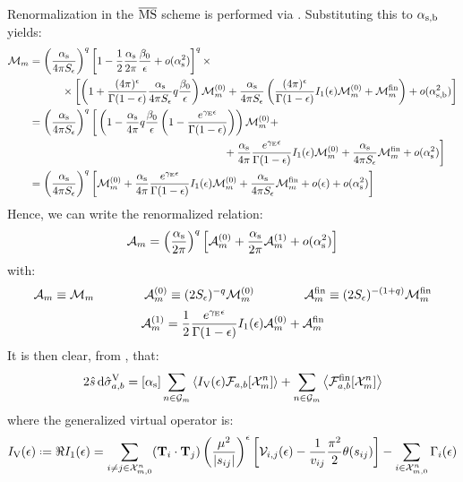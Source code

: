 Renormalization in the $ \overline{\text{MS}} $ scheme is performed via . Substituting this to $ \alpha_\text{s,b} $ yields:
\begin{equation*}
  \begin{split}
    \mathcal{M}_m
    & = \left( \frac{\alpha_\text{s}}{4\pi S_\epsilon} \right)^q \left[ 1 - \frac{1}{2} \frac{\alpha_\text{s}}{2\pi} \frac{\beta_0}{\epsilon} + o(\alpha_\text{s}^2) \right]^q \times \\
    & \qquad \quad \times \left[ \left( 1 + \frac{(4\pi)^\epsilon}{\Gamma(1-\epsilon)} \frac{\alpha_\text{s}}{4\pi S_\epsilon} q \frac{\beta_0}{\epsilon} \right) \mathcal{M}_m^{(0)} + \frac{\alpha_\text{s}}{4\pi S_\epsilon} \left( \frac{(4\pi)^\epsilon}{\Gamma(1-\epsilon)} I_1(\epsilon) \mathcal{M}_m^{(0)} + \mathcal{M}_m^\text{fin} \right) + o(\alpha_\text{s,b}^2) \right] \\
    & = \left( \frac{\alpha_\text{s}}{4\pi S_\epsilon} \right)^q \bigg[ \left( 1 - \frac{\alpha_\text{s}}{4\pi} q \frac{\beta_0}{\epsilon} \left( 1 - \frac{e^{\gamma_\text{E}\epsilon}}{\Gamma(1-\epsilon)} \right) \right) \mathcal{M}_m^{(0)} + \\
    & \qquad \qquad \qquad \qquad \qquad \qquad \qquad \qquad \qquad + \frac{\alpha_\text{s}}{4\pi} \frac{e^{\gamma_\text{E}\epsilon}}{\Gamma(1-\epsilon)} I_1(\epsilon) \mathcal{M}_m^{(0)} + \frac{\alpha_\text{s}}{4\pi S_\epsilon} \mathcal{M}_m^\text{fin} + o(\alpha_\text{s}^2) \bigg] \\
    & = \left( \frac{\alpha_\text{s}}{4\pi S_\epsilon} \right)^q \left[ \mathcal{M}_m^{(0)} + \frac{\alpha_\text{s}}{4\pi} \frac{e^{\gamma_\text{E}\epsilon}}{\Gamma(1-\epsilon)} I_1(\epsilon) \mathcal{M}_m^{(0)} + \frac{\alpha_\text{s}}{4\pi S_\epsilon} \mathcal{M}_m^\text{fin} + o(\epsilon) + o(\alpha_\text{s}^2) \right]
  \end{split}
\end{equation*}
Hence, we can write the renormalized relation:
\begin{equation}
  \mathcal{A}_m = \left( \frac{\alpha_\text{s}}{2\pi} \right)^q \left[ \mathcal{A}_m^{(0)} + \frac{\alpha_\text{s}}{2\pi} \mathcal{A}_m^{(1)} + o(\alpha_\text{s}^2) \right]
\end{equation}
with:
\begin{equation}
  \mathcal{A}_m \equiv \mathcal{M}_m
  \qquad \qquad
  \mathcal{A}_m^{(0)} \equiv (2S_\epsilon)^{-q} \mathcal{M}_m^{(0)}
  \qquad \qquad
  \mathcal{A}_m^\text{fin} \equiv (2S_\epsilon)^{-(1+q)} \mathcal{M}_m^\text{fin}
\end{equation}
\begin{equation}
  \mathcal{A}_m^{(1)} = \frac{1}{2} \frac{e^{\gamma_\text{E}\epsilon}}{\Gamma(1-\epsilon)} I_1(\epsilon) \mathcal{A}_m^{(0)} + \mathcal{A}_m^\text{fin}
\end{equation}
It is then clear, from , that:
\begin{equation}
  2\hat{s}\, \mathrm{d}\hat{\sigma}_{a,b}^\text{V} = [\alpha_\text{s}] \sum_{n \in \mathcal{G}_m} \left\langle I_\text{V}(\epsilon) \mathcal{F}_{a,b}[\mathcal{X}^{n}_{m}] \right\rangle + \sum_{n \in \mathcal{G}_m} \left\langle \mathcal{F}_{a,b}^\text{fin}[\mathcal{X}^{n}_{m}] \right\rangle
\end{equation}
where the generalized virtual operator is:
\begin{equation}
  \ivo(\de) \defeq \Re \ioo(\de) = \sum_{i \neq j \in \fsp{n}{m}} (\cc) \left( \frac{\mu^2}{\abs{s_{ij}}} \right)^\de \left[ \ns_{i,j}(\de) - \frac{1}{v_{ij}} \frac{\pi^2}{2} \theta(s_{ij}) \right] - \sum_{i \in \fsp{n}{m}} \Gamma_i(\de)
  \label{eq:ivo-gen}
\end{equation}

